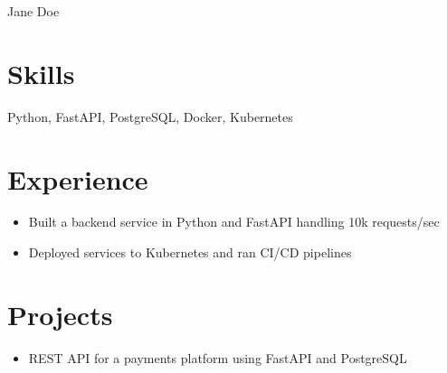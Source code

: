 \documentclass{article}
\begin{document}
Jane Doe

\section{Skills}
Python, FastAPI, PostgreSQL, Docker, Kubernetes

\section{Experience}
\begin{itemize}
\item Built a backend service in Python and FastAPI handling 10k requests/sec
\item Deployed services to Kubernetes and ran CI/CD pipelines
\end{itemize}

\section{Projects}
\begin{itemize}
\item REST API for a payments platform using FastAPI and PostgreSQL
\end{itemize}
\end{document}
